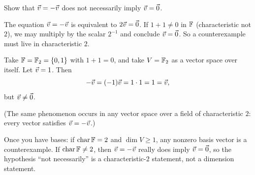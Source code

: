 \begin{promptbox}
Show that $\vec{v}=-\vec{v}$ does not necessarily imply $\vec{v}=\vec{0}$.
\end{promptbox}

\begin{coursebox}
The equation $\vec{v}=-\vec{v}$ is equivalent to $2\vec{v}=\vec{0}$. If $1+1\neq 0$ in $\mathbb{F}$
(characteristic not $2$), we may multiply by the scalar $2^{-1}$ and conclude
$\vec{v}=\vec{0}$. So a counterexample must live in characteristic $2$.

Take $\mathbb{F}=\mathbb{F}_2=\{0,1\}$ with $1+1=0$, and take $V=\mathbb{F}_2$ as a vector space over
itself. Let $\vec{v}=1$. Then
\[
-\vec{v}=(-1)\vec{v}=1\cdot 1=1=\vec{v},
\]
but $\vec{v}\neq\vec{0}$.

(The same phenomenon occurs in any vector space over a field of characteristic
$2$: every vector satisfies $\vec{v}=-\vec{v}$.)
\end{coursebox}

\begin{laterbox}
Once you have bases: if $\operatorname{char}\mathbb{F}=2$ and $\dim V\ge 1$, any nonzero
basis vector is a counterexample. If $\operatorname{char}\mathbb{F}\neq 2$, then
$\vec{v}=-\vec{v}$ really does imply $\vec{v}=\vec{0}$, so the hypothesis ``not necessarily''
is a characteristic-$2$ statement, not a dimension statement.
\end{laterbox}
